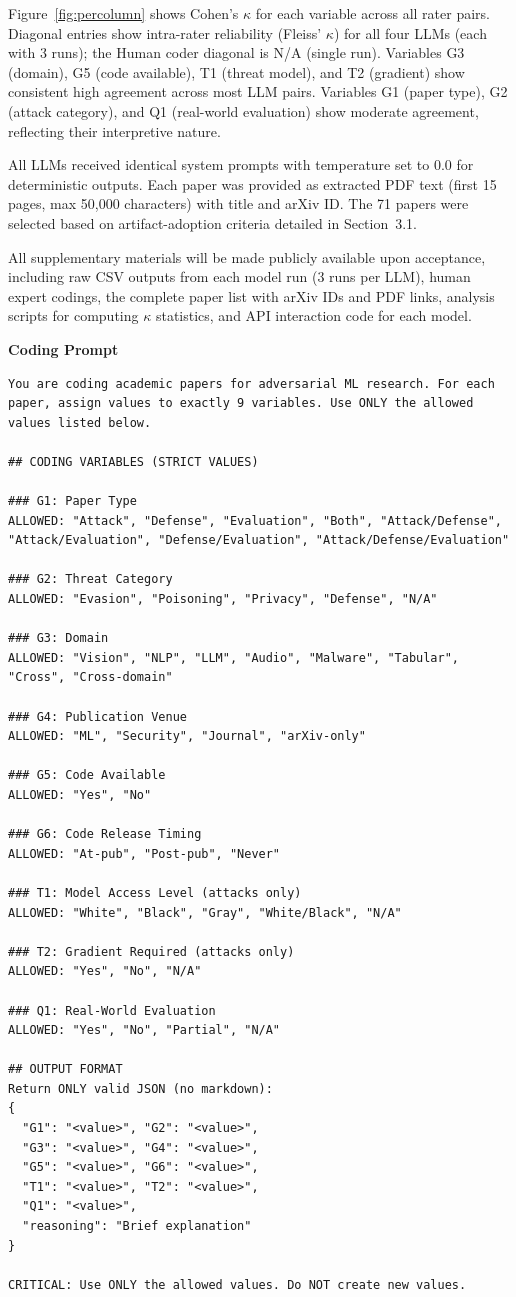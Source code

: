 \documentclass[conference,compsoc]{IEEEtran}
\begin{document}
\noindent Figure~\ref{fig:percolumn} shows Cohen's $\kappa$ for each variable across all rater pairs. Diagonal entries show intra-rater reliability (Fleiss' $\kappa$) for all four LLMs (each with 3 runs); the Human coder diagonal is N/A (single run). Variables G3 (domain), G5 (code available), T1 (threat model), and T2 (gradient) show consistent high agreement across most LLM pairs. Variables G1 (paper type), G2 (attack category), and Q1 (real-world evaluation) show moderate agreement, reflecting their interpretive nature.

All LLMs received identical system prompts with temperature set to 0.0 for deterministic outputs. Each paper was provided as extracted PDF text (first 15 pages, max 50,000 characters) with title and arXiv ID. The 71 papers were selected based on artifact-adoption criteria detailed in Section~3.1.

All supplementary materials will be made publicly available upon acceptance, including raw CSV outputs from each model run (3 runs per LLM), human expert codings, the complete paper list with arXiv IDs and PDF links, analysis scripts for computing $\kappa$ statistics, and API interaction code for each model.

\bigskip
\noindent\textbf{Coding Prompt}
\begin{lstlisting}
You are coding academic papers for adversarial ML research. For each paper, assign values to exactly 9 variables. Use ONLY the allowed values listed below.

## CODING VARIABLES (STRICT VALUES)

### G1: Paper Type
ALLOWED: "Attack", "Defense", "Evaluation", "Both", "Attack/Defense", "Attack/Evaluation", "Defense/Evaluation", "Attack/Defense/Evaluation"

### G2: Threat Category
ALLOWED: "Evasion", "Poisoning", "Privacy", "Defense", "N/A"

### G3: Domain
ALLOWED: "Vision", "NLP", "LLM", "Audio", "Malware", "Tabular", "Cross", "Cross-domain"

### G4: Publication Venue
ALLOWED: "ML", "Security", "Journal", "arXiv-only"

### G5: Code Available
ALLOWED: "Yes", "No"

### G6: Code Release Timing
ALLOWED: "At-pub", "Post-pub", "Never"

### T1: Model Access Level (attacks only)
ALLOWED: "White", "Black", "Gray", "White/Black", "N/A"

### T2: Gradient Required (attacks only)
ALLOWED: "Yes", "No", "N/A"

### Q1: Real-World Evaluation
ALLOWED: "Yes", "No", "Partial", "N/A"

## OUTPUT FORMAT
Return ONLY valid JSON (no markdown):
{
  "G1": "<value>", "G2": "<value>",
  "G3": "<value>", "G4": "<value>",
  "G5": "<value>", "G6": "<value>",
  "T1": "<value>", "T2": "<value>",
  "Q1": "<value>",
  "reasoning": "Brief explanation"
}

CRITICAL: Use ONLY the allowed values. Do NOT create new values.
\end{lstlisting}
\end{document}
